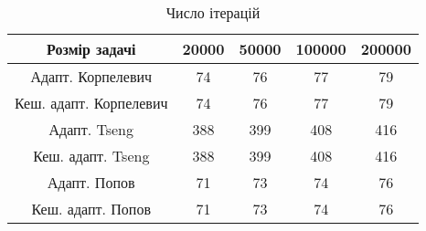 \begin{table}[H]
	\centering
	\begin{tabular}{|c||c|c|c|c|}\hline
		Розмір задачі & 20000 & 50000 & 100000 & 200000 \\ \hline \hline
		Адапт. Корпелевич & 74 & 76 & 77 & 79 \\ \hline
		Кеш. адапт. Корпелевич & 74 & 76 & 77 & 79 \\ \hline
		Адапт. Tseng & 388 & 399 & 408 & 416 \\ \hline
		Кеш. адапт. Tseng & 388 & 399 & 408 & 416 \\ \hline
		Адапт. Попов & 71 & 73 & 74 & 76 \\ \hline
		Кеш. адапт. Попов & 71 & 73 & 74 & 76 \\ \hline
	\end{tabular}
	\caption{Число ітерацій}
\end{table}
